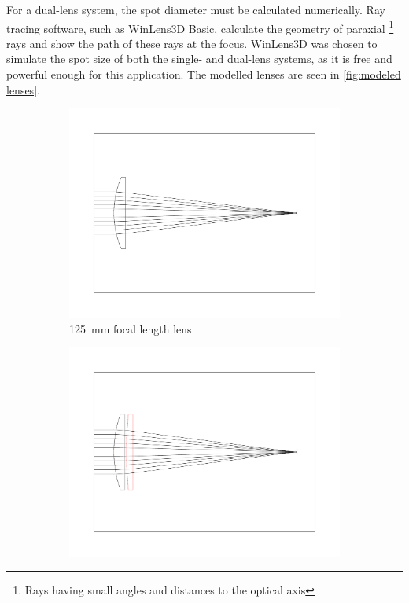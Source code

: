             For a dual-lens system, the spot diameter must be calculated numerically. Ray tracing software, such as WinLens3D Basic, calculate the geometry of paraxial \footnote{Rays having small angles and distances to the optical axis} rays and show the path of these rays at the focus. WinLens3D was chosen to simulate the spot size of both the single- and dual-lens systems, as it is free and powerful enough for this application. The modelled lenses are seen in \autoref{fig:modeled lenses}.
            \begin{figure}[!ht]
                \centering
                \begin{subfigure}[t]{0.45\textwidth}
                    \centering
                    \includegraphics[width=\textwidth]{assets/4 experiments/125lens.pdf}
                    \caption{\qty{125}{mm} focal length lens}
                \end{subfigure}
                \hfill
                \begin{subfigure}[t]{0.45\textwidth}
                    \centering
                    \includegraphics[width=\textwidth]{assets/4 experiments/500 and 150 lenses.pdf}

\end{subfigure}
\end{figure}

